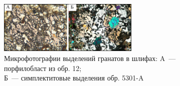 \begin{figure}[H]
  \begin{center}
    \includegraphics[width=0.6\textwidth]{authors/polzunenkov-fig1.png}
  \end{center}
  \caption {Микрофотографии выделений гранатов в шлифах: A~--- порфилобласт из обр. 12; \\Б~--- симплектитовые выделения обр. 5301-A
}

\end{figure}
